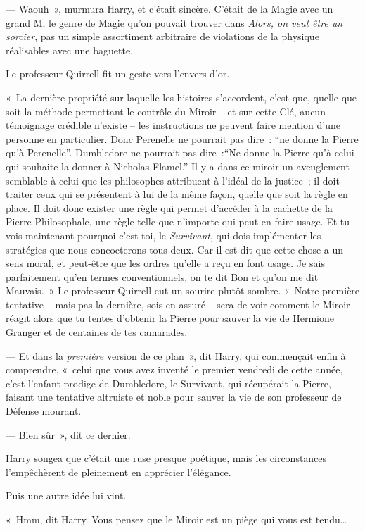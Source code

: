 --- Waouh~», murmura Harry, et c'était sincère.
C'était de la Magie avec un grand M, le genre de Magie qu'on pouvait trouver dans \emph{Alors, on veut être un sorcier}, pas un simple assortiment arbitraire de violations de la physique réalisables avec une baguette.

Le professeur Quirrell fit un geste vers l'envers d'or.

«~La dernière propriété sur laquelle les histoires s'accordent, c'est que, quelle que soit la méthode permettant le contrôle du Miroir -- et sur cette Clé, aucun témoignage crédible n'existe -- les instructions ne peuvent faire mention d'une personne en particulier.
Donc Perenelle ne pourrait pas dire~: “ne donne la Pierre qu'à Perenelle”.
Dumbledore ne pourrait pas dire~:“Ne donne la Pierre qu'à celui qui souhaite la donner à Nicholas Flamel.” Il y a dans ce miroir un aveuglement semblable à celui que les philosophes attribuent à l'idéal de la justice~; il doit traiter ceux qui se présentent à lui de la même façon, quelle que soit la règle en place.
Il doit donc exister une règle qui permet d'accéder à la cachette de la Pierre Philosophale, une règle telle que n'importe qui peut en faire usage.
Et tu vois maintenant pourquoi c'est toi, le \emph{Survivant}, qui dois implémenter les stratégies que nous concocterons tous deux.
Car il est dit que cette chose a un sens moral, et peut-être que les ordres qu'elle a reçu en font usage.
Je sais parfaitement qu'en termes conventionnels, on te dit Bon et qu'on me dit Mauvais.~»
Le professeur Quirrell eut un sourire plutôt sombre.
«~Notre première tentative -- mais pas la dernière, sois-en assuré -- sera de voir comment le Miroir réagit alors que tu tentes d'obtenir la Pierre pour sauver la vie de Hermione Granger et de centaines de tes camarades.

--- Et dans la \emph{première} version de ce plan~», dit Harry, qui commençait enfin à comprendre, «~celui que vous avez inventé le premier vendredi de cette année, c'est l'enfant prodige de Dumbledore, le Survivant, qui récupérait la Pierre, faisant une tentative altruiste et noble pour sauver la vie de son professeur de Défense mourant.

--- Bien sûr~», dit ce dernier.

Harry songea que c'était une ruse presque poétique, mais les circonstances l'empêchèrent de pleinement en apprécier l'élégance.

Puis une autre idée lui vint.

«~Hmm, dit Harry.
Vous pensez que le Miroir est un piège qui vous est tendu…


